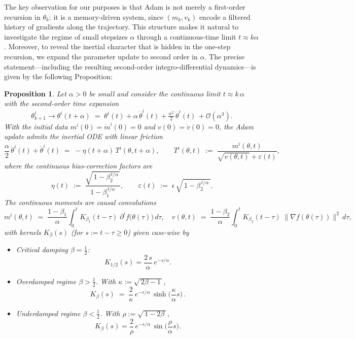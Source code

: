 \documentclass{article} %
\newtheorem{proposition}{Proposition}
\begin{document}
The key observation for our purposes is that Adam is not merely a first-order recursion in \(\theta_k\): it is a memory-driven system, since \((m_k,v_k)\) encode a filtered history of gradients along the trajectory. This structure makes it natural to investigate the regime of small stepsizes \(\alpha\) through a continuous-time limit \(t\approx k\alpha\). Moreover, to reveal the inertial character that is hidden in the one-step recursion, we expand the parameter update to second order in \(\alpha\). The precise statement---including the resulting second-order integro-differential dynamics---is given by the following Proposition:

\begin{proposition}\label{prop:Adam2}
Let $\alpha>0$ be small and consider the continuous limit $t\approx k\,\alpha$ with the second-order time expansion
\[
\theta^i_{k+1} \to \theta^i(t+\alpha)\;=\;\theta^i(t)+\alpha\,\dot\theta^i(t)+\tfrac{\alpha^2}{2}\,\ddot\theta^i(t)\,+\mathcal{O}(\alpha^3).
\]
With the initial data $m^i(0)=\dot m^i(0)=0$ and $v(0)=\dot v(0)=0$, the Adam update admits the inertial ODE with linear friction
\begin{equation}\label{eq:inertial}
\frac{\alpha}{2}\,\ddot\theta^i(t)+\dot\theta^i(t)\;=\;-\eta(t+\alpha)\,T^i(\theta,t+\alpha),
\qquad
T^i(\theta,t)\;:=\;\frac{m^i(\theta,t)}{\sqrt{v(\theta,t)}+\varepsilon(t)}, 
\end{equation}
where the continuous bias-correction factors are
\[
\eta(t)\;:=\;\frac{\sqrt{\,1-\beta_2^{\,t/\alpha}\,}}{\,1-\beta_1^{\,t/\alpha}\,},\qquad
\varepsilon(t)\;:=\;\epsilon\,\sqrt{\,1-\beta_2^{\,t/\alpha}\,}.
\]
The continuous moments are causal convolutions
\[
m^i(\theta,t)\;=\;\frac{1-\beta_1}{\alpha}\int_{0}^{t} K_{\beta_1}(t-\tau)\;\partial^i f\!\big(\theta(\tau)\big)\,d\tau,\quad
v(\theta,t)\;=\;\frac{1-\beta_2}{\alpha}\int_{0}^{t} K_{\beta_2}(t-\tau)\;\|\nabla f(\theta(\tau))\|^2\,d\tau,
\]
with kernels $K_\beta(s)$ (for $s:=t-\tau\ge 0$) given case-wise by
\begin{itemize}
\item[\textbullet] Critical damping $\beta=\tfrac12$:
\[
K_{1/2}(s)=\frac{2\,s}{\alpha}\,e^{-s/\alpha}.
\]
\item[\textbullet] Overdamped regime $\beta>\tfrac12$. With $\kappa:=\sqrt{\,2\beta-1\,}$,
\[
K_\beta(s)\;=\; \frac{2}{\kappa}\,e^{-s/\alpha}\,\sinh\!\Big(\frac{\kappa}{\alpha}s\Big)\,.
\]
\item[\textbullet] Underdamped regime $\beta<\tfrac12$. With $\rho:=\sqrt{\,1-2\beta\,}$,
\[
K_\beta(s)=\frac{2}{\rho}\,e^{-s/\alpha}\,\sin\!\Big(\frac{\rho}{\alpha}s\Big).
\]
\end{itemize}
\end{proposition}
\end{document}
